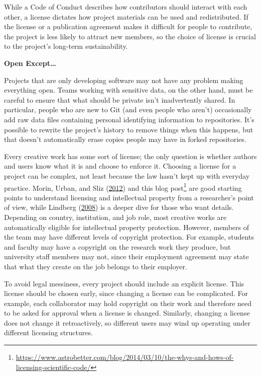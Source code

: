 \documentclass[
]{krantz}
\renewenvironment{quote}{\begin{VF}}{\end{VF}}
\renewcommand{\href}[2]{#2\footnote{\url{#1}}}
\begin{document}
While a Code of Conduct describes how contributors should interact with each other,
a license dictates how project materials can be used and redistributed.
If the license or a publication agreement makes it difficult for people to contribute,
the project is less likely to attract new members,
so the choice of license is crucial to the project's long-term sustainability.

\begin{quote}
\textbf{Open Except\ldots{}}

Projects that are only developing software may not have any problem making everything open.
Teams working with sensitive data, on the other hand,
must be careful to ensure that what should be private isn't inadvertently shared.
In particular,
people who are new to Git (and even people who aren't)
occasionally add raw data files containing personal identifying information to repositories.
It's possible to rewrite the project's history to remove things when this happens,
but that doesn't automatically erase copies people may have in forked repositories.
\end{quote}

Every creative work has some sort of license;
the only question is whether authors and users know what it is and choose to enforce it.
Choosing a license for a project can be complex,
not least because the law hasn't kept up with everyday practice.
Morin, Urban, and Sliz (\protect\hyperlink{ref-Mori2012}{2012}) and \href{https://www.astrobetter.com/blog/2014/03/10/the-whys-and-hows-of-licensing-scientific-code/}{this blog post} are good starting points
to understand licensing and intellectual property from a researcher's point of view,
while Lindberg (\protect\hyperlink{ref-Lind2008}{2008}) is a deeper dive for those who want details.
Depending on country, institution, and job role,
most creative works are automatically eligible for intellectual property protection.
However,
members of the team may have different levels of copyright protection.
For example,
students and faculty may have a copyright on the research work they produce,
but university staff members may not,
since their employment agreement may state that
what they create on the job belongs to their employer.

To avoid legal messiness,
every project should include an explicit license.
This license should be chosen early,
since changing a license can be complicated.
For example,
each collaborator may hold copyright on their work
and therefore need to be asked for approval when a license is changed.
Similarly,
changing a license does not change it retroactively,
so different users may wind up operating under different licensing structures.
\end{document}
